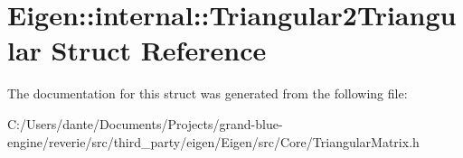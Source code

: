 \hypertarget{struct_eigen_1_1internal_1_1_triangular2_triangular}{}\section{Eigen\+::internal\+::Triangular2\+Triangular Struct Reference}
\label{struct_eigen_1_1internal_1_1_triangular2_triangular}


The documentation for this struct was generated from the following file\+:\begin{DoxyCompactItemize}
\item 
C\+:/\+Users/dante/\+Documents/\+Projects/grand-\/blue-\/engine/reverie/src/third\+\_\+party/eigen/\+Eigen/src/\+Core/Triangular\+Matrix.\+h\end{DoxyCompactItemize}
